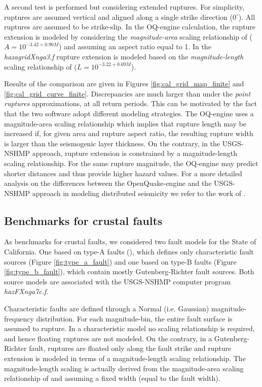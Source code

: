 A second test is performed but considering extended ruptures. For simplicity, ruptures are assumed vertical and aligned along a single strike direction ($0^{\circ}$). All ruptures are assumed to be strike-slip. In the OQ-engine calculation, the rupture extension is modeled by considering the \textit{magnitude-area} scaling relationship of \citet{wells1994} ($A = 10^{-3.42 + 0.90 M}$) and assuming an aspect ratio equal to 1. In the \textit{hazagridXnga3.f} rupture extension is modeled based on the \textit{magnitude-length} scaling relationship of \citet{wells1994} ($L = 10^{-3.22+0.69 M}$).

Results of the comparison are given in Figures \ref{fig:cal_grid_map_finite} and \ref{fig:cal_grid_curve_finite}. Discrepancies are much larger than under the \textit{point ruptures} approximations, at all return periods. This can be motivated by the fact that the two software adopt different modeling strategies. The OQ-engine uses a magnitude-area scaling relationship which implies that rupture length may be increased if, for given area and rupture aspect ratio, the resulting rupture width is larger than the seismogenic layer thickness. On the contrary, in the USGS-NSHMP approach, rupture extension is constrained by a magnitude-length scaling relationship. For the same rupture magnitude, the OQ-engine may predict shorter distances and thus provide higher hazard values. For a more detailed analysis on the differences between the OpenQuake-engine and the USGS-NSHMP approach in modeling distributed seismicity we refer to the work of \citet{monelli2014}.

\subsection{Benchmarks for crustal faults}
As benchmarks for crustal faults, we considered two fault models for the State of California. One based on type-A faults (\cite{petersen2008}), which defines only characteristic fault sources (Figure \ref{fig:type_a_fault}) and one based on type-B faults (Figure \ref{fig:type_b_fault}), which contain mostly Gutenberg-Richter fault sources. Both source models are associated with the USGS-NSHMP computer program \textit{hazFXnga7c.f}.

Characteristic faults are defined through a Normal (i.e. Gaussian) magnitude-frequency distribution. For each magnitude-bin, the entire fault surface is assumed to rupture. In a characteristic model no scaling relationship is required, and hence floating ruptures are not modeled. On the contrary, in a Gutenberg-Richter fault, ruptures are floated only along the fault strike and rupture extension is modeled in terms of a magnitude-length scaling relationship. The magnitude-length scaling is actually derived from the magnitude-area scaling relationship of \citet{hanks2002} and assuming a fixed width (equal to the fault width).

